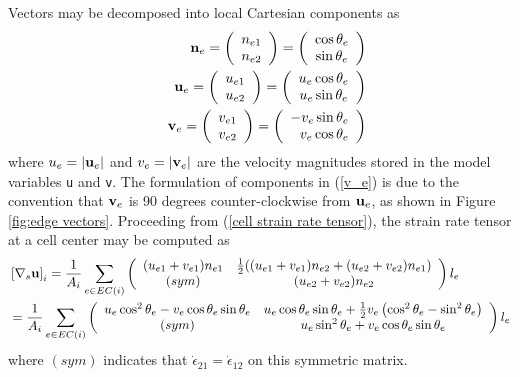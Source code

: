 \documentclass[11pt]{report}
\begin{document}
Vectors may be decomposed into local Cartesian components as
\begin{eqnarray}
&&{\bf n}_e = \left( \begin{array}{c} n_{e1} \\ n_{e2} \end{array} \right)
  = \left( \begin{array}{c} \cos{\theta_{e}} \\ \sin{\theta_{e}} \end{array} \right)\\
\label{u_e}
&&{\bf u}_e = \left( \begin{array}{c} u_{e1} \\ u_{e2} \end{array} \right)
  = \left( \begin{array}{c} u_e \cos{\theta_{e}} \\ u_e \sin{\theta_{e}} \end{array} \right)\\
\label{v_e}
&&{\bf v}_e = \left( \begin{array}{c} v_{e1} \\ v_{e2} \end{array} \right)
  = \left( \begin{array}{r} -v_e \sin{\theta_{e}} \\ v_e \cos{\theta_{e}} \end{array} \right)
\end{eqnarray}
where $u_e = |{\bf u}_e|$ and $v_e = |{\bf v}_e|$ are the velocity magnitudes stored in the model variables \verb|u| and \verb|v|.  The formulation of components in (\ref{v_e}) is due to the convention that ${\bf v}_e$ is 90 degrees counter-clockwise from ${\bf u}_e$, as shown in Figure \ref{fig:edge vectors}.  Proceeding from (\ref{cell strain rate tensor}), the strain rate tensor at a cell center may be computed as 
\begin{eqnarray}
&\left[\nabla_s {\bf u} \right]_i
= \displaystyle
\frac{1}{A_i} 
\sum_{e\in EC(i)} 
\left( \begin{array}{cc} (u_{e1} + v_{e1})n_{e1}  
               & \frac{1}{2}((u_{e1} + v_{e1})n_{e2} + (u_{e2} + v_{e2})n_{e1}) \\ 
                 (sym)  &
                       (u_{e2} + v_{e2})n_{e2} \end{array} \right) l_e\\
&=\displaystyle\frac{1}{A_i} \sum_{e\in EC(i)} 
\left( \begin{array}{cc} u_e \cos^2\theta_e - v_e \cos{\theta_e} \sin{\theta_e} 
 & u_e \cos{\theta_e} \sin{\theta_e} + \frac{1}{2}v_e\left(\cos^2\theta_e - \sin^2\theta_e\right)\\
   (sym)
 &                     u_e \sin^2\theta_e + v_e \cos{\theta_e} \sin{\theta_e} \end{array} \right)l_e
\end{eqnarray}
where $(sym)$ indicates that $\dot{\epsilon}_{21}=\dot{\epsilon}_{12}$ on this symmetric matrix.
\end{document}
